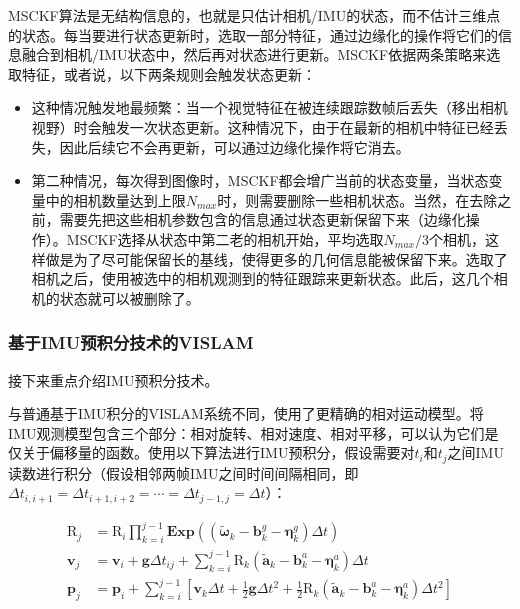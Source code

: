 MSCKF算法是无结构信息的，也就是只估计相机/IMU的状态，而不估计三维点的状态。每当要进行状态更新时，选取一部分特征，通过边缘化的操作将它们的信息融合到相机/IMU状态中，然后再对状态进行更新。MSCKF依据两条策略来选取特征，或者说，以下两条规则会触发状态更新：

\begin{itemize}
    \item 这种情况触发地最频繁：当一个视觉特征在被连续跟踪数帧后丢失（移出相机视野）时会触发一次状态更新。这种情况下，由于在最新的相机中特征已经丢失，因此后续它不会再更新，可以通过边缘化操作将它消去。
    \item 第二种情况，每次得到图像时，MSCKF都会增广当前的状态变量，当状态变量中的相机数量达到上限$N_{max}$时，则需要删除一些相机状态。当然，在去除之前，需要先把这些相机参数包含的信息通过状态更新保留下来（边缘化操作）。MSCKF选择从状态中第二老的相机开始，平均选取$N_{max}/3$个相机，这样做是为了尽可能保留长的基线，使得更多的几何信息能被保留下来。选取了相机之后，使用被选中的相机观测到的特征跟踪来更新状态。此后，这几个相机的状态就可以被删除了。
\end{itemize}

\subsubsection*{基于IMU预积分技术的VISLAM}

接下来重点介绍IMU预积分技术\citep{forster2017manifold}。

与普通基于IMU积分的VISLAM系统不同，\citeauthor{forster2017manifold}使用了更精确的相对运动模型。将IMU观测模型包含三个部分：相对旋转、相对速度、相对平移，可以认为它们是仅关于偏移量的函数。使用以下算法进行IMU预积分，假设需要对$t_i$和$t_j$之间IMU读数进行积分（假设相邻两帧IMU之间时间间隔相同，即$\Delta t_{i,i+1} = \Delta t_{i+1,i+2} = \cdots = \Delta t_{j-1,j} = \Delta t$）：

\begin{equation}
\begin{aligned}
\mathrm{R}_j &= \mathrm{R}_i \prod_{k=i}^{j-1}
                \bm{Exp}\left(
                    (\tilde{\bm\omega}_k - \mathbf{b}_k^g - \bm{\eta}_k^g) \Delta t
                \right) \\
\mathbf{v}_j &= \mathbf{v}_i + \mathbf{g} \Delta t_{ij} + \sum_{k=i}^{j-1}
                \mathrm{R}_k (\tilde{\mathbf a}_k - \mathbf{b}_k^a - \bm\eta_k^a) \Delta t \\
\mathbf{p}_j &= \mathbf{p}_i + \sum_{k=i}^{j-1}
                \left[
                    \mathbf{v}_k \Delta t +
                    \frac{1}{2}\mathbf{g}\Delta t^2 +
                    \frac{1}{2}\mathrm{R}_k
                    (\tilde{\mathbf a}_k - \mathbf{b}_k^a - \bm\eta_k^a) \Delta t^2
                \right]
    \end{aligned}
\end{equation}

